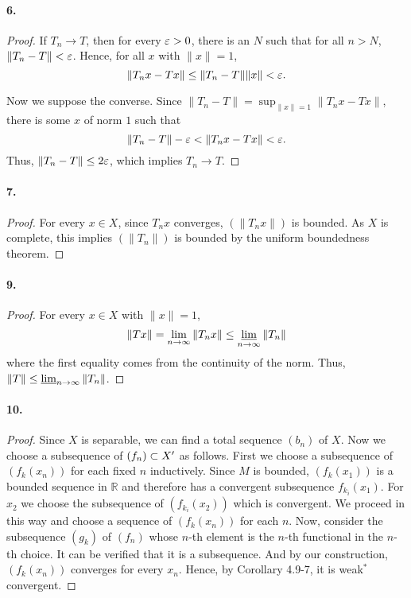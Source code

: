   \paragraph{6.}
  \begin{proof}
    If $T_n\to T$, then for every $\varepsilon>0$, there is an $N$ such that for all 
    $n>N$, $\|T_n-T\|<\varepsilon$. Hence, for all $x$ with $\|x\|=1$,
    \[
      \|T_nx-Tx\|\le \|T_n-T\|\|x\|<\varepsilon.
    \]\par
    Now we suppose the converse. Since $\|T_n-T\|=\sup_{\|x\|=1}\|T_nx-Tx\|$, 
    there is some $x$ of norm $1$ such that 
    \[
      \|T_n-T\|-\varepsilon<\|T_nx-Tx\|<\varepsilon.
    \]
    Thus, $\|T_n-T\|\le 2\varepsilon$, which implies $T_n\to T$.
  \end{proof}
  
  \paragraph{7.}
  \begin{proof}
    For every $x\in X$, since $T_nx$ converges, $(\|T_nx\|)$ is bounded. As $X$
    is complete, this implies $(\|T_n\|)$ is bounded by the uniform boundedness
    theorem.
  \end{proof}
  
  \paragraph{9.}
  \begin{proof}
    For every $x\in X$ with $\|x\|=1$, 
    \[
      \|Tx\|=\lim_{n\to\infty}\|T_nx\|\le \operatorname*{\underline{lim}}_{n\to\infty}\|T_n\|
    \]
    where the first equality comes from the continuity of the norm. Thus, $\|T\|
    \le \operatorname*{\underline{lim}}_{n\to\infty}\|T_n\|$.
  \end{proof}
  
  \paragraph{10.}
  \begin{proof}
    Since $X$ is separable, we can find a total sequence $(b_n)$ of $X$. Now we
    choose a subsequence of $(f_n)\subset X^\prime$ as follows. First we choose a 
    subsequence of $(f_k(x_n))$ for each fixed $n$ inductively. Since $M$ is
    bounded, $(f_k(x_1))$ is a bounded sequence in $\mathbb{R}$ and therefore
    has a convergent subsequence $f_{k_i}(x_1)$. For $x_2$ we choose the 
    subsequence of $(f_{k_i}(x_2))$ which is convergent. We proceed in this way
    and choose a sequence of $(f_k(x_n))$ for each $n$. Now, consider the
    subsequence $(g_k)$ of $(f_n)$ whose $n$-th element is the $n$-th functional 
    in the $n$-th choice. It can be verified that it is a subsequence. And by
    our construction, $(f_k(x_n))$ converges for every $x_n$. Hence, by 
    Corollary 4.9-7, it is weak$^*$ convergent.
  \end{proof}
\setcounter{subsection}{11}
